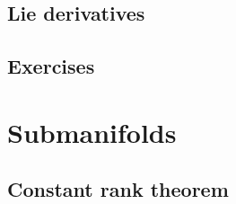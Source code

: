 \documentclass{../note}
\begin{document}
\section{Lie derivatives}
\begin{prb}
\end{prb}

\section*{Exercises}
\begin{prb}[Orientation]
\end{prb}











\chapter{Submanifolds}


\section{Constant rank theorem}
\end{document}
